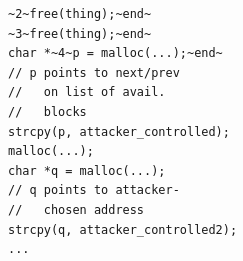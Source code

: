 \documentclass[tikz]{standalone}
\begin{document}
\begin{lrbox}{\dblFreeCode}
\begin{lstlisting}
~2~free(thing);~end~
~3~free(thing);~end~
char *~4~p = malloc(...);~end~
// p points to next/prev
//   on list of avail.
//   blocks
strcpy(p, attacker_controlled);
malloc(...);
char *q = malloc(...);
// q points to attacker-
//   chosen address
strcpy(q, attacker_controlled2);
...
\end{lstlisting}
\end{lrbox}





\end{document}
